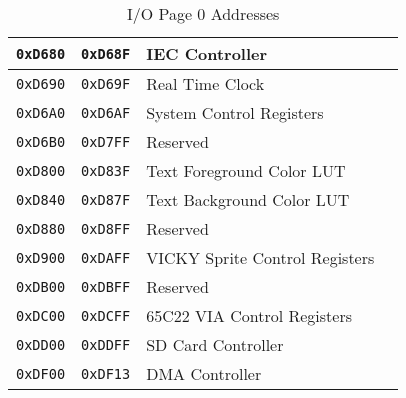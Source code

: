 \begin{table}[ht]
\begin{center}
\begin{tabular}{|c|c|l|l|}
            \verb+0xD680+ & \verb+0xD68F+ & IEC Controller & \pageref{tab:via_reg} \\ \hline
            \verb+0xD690+ & \verb+0xD69F+ & Real Time Clock & \pageref{tab:rtc_registers} \\ \hline
            \verb+0xD6A0+ & \verb+0xD6AF+ & System Control Registers & \pageref{sec:sysctrl} \\ \hline
            \verb+0xD6B0+ & \verb+0xD7FF+ & Reserved & \\ \hline
            \verb+0xD800+ & \verb+0xD83F+ & Text Foreground Color LUT & \multirow{2}{*}{\pageref{tab:text_luts}} \\ \cline{1-3}
            \verb+0xD840+ & \verb+0xD87F+ & Text Background Color LUT & \\ \hline
            \verb+0xD880+ & \verb+0xD8FF+ & Reserved & \\ \hline
            \verb+0xD900+ & \verb+0xDAFF+ & VICKY Sprite Control Registers & \pageref{tab:sp_reg} \\ \hline
            \verb+0xDB00+ & \verb+0xDBFF+ & Reserved & \\ \hline
            \verb+0xDC00+ & \verb+0xDCFF+ & 65C22 VIA Control Registers & \pageref{tab:via_reg}\\ \hline
            \verb+0xDD00+ & \verb+0xDDFF+ & SD Card Controller & \pageref{tab:ps2_reg} \\ \hline
            \verb+0xDF00+ & \verb+0xDF13+ & DMA Controller & \pageref{tab:dma_reg} \\ \hline
        \end{tabular}
        \caption{I/O Page 0 Addresses}
        \label{tab:io_page_0}
    \end{center}
\end{table}
